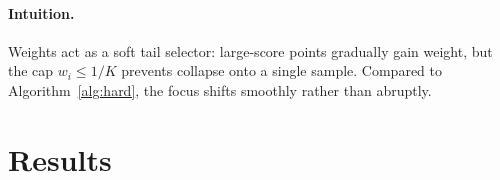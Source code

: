 \documentclass[11pt]{article}
\newcommand{\yh}{\hat y}
\theoremstyle{plain}
\theoremstyle{definition}
\newcommand{\1}{\mathbf{1}}
\begin{document}
\paragraph{Intuition.}
Weights act as a soft tail selector: large-score points gradually gain weight, but the cap $w_i\le 1/K$ prevents collapse onto a single sample. Compared to Algorithm~\ref{alg:hard}, the focus shifts smoothly rather than abruptly.




\section{Results}
\end{document}
